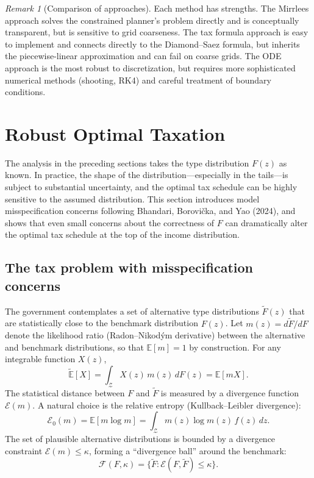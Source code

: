 \documentclass[12pt,a4paper]{article}
\theoremstyle{definition}
\theoremstyle{plain}
\theoremstyle{remark}
\newtheorem{remark}{Remark}[section]
\newcommand{\E}{\mathbb{E}}
\newcommand{\calZ}{\mathcal{Z}}
\begin{document}
\begin{remark}[Comparison of approaches]
Each method has strengths. The Mirrlees approach solves the constrained planner's problem directly and is conceptually transparent, but is sensitive to grid coarseness. The tax formula approach is easy to implement and connects directly to the Diamond--Saez formula, but inherits the piecewise-linear approximation and can fail on coarse grids. The ODE approach is the most robust to discretization, but requires more sophisticated numerical methods (shooting, RK4) and careful treatment of boundary conditions.
\end{remark}



\section{Robust Optimal Taxation}
\label{sec:robust_taxation}

The analysis in the preceding sections takes the type distribution $F(z)$ as known. In practice, the shape of the distribution---especially in the tails---is subject to substantial uncertainty, and the optimal tax schedule can be highly sensitive to the assumed distribution. This section introduces model misspecification concerns following Bhandari, Borovi\v{c}ka, and Yao (2024), and shows that even small concerns about the correctness of $F$ can dramatically alter the optimal tax schedule at the top of the income distribution.

\subsection{The tax problem with misspecification concerns}
\label{sec:robust_problem}

The government contemplates a set of alternative type distributions $\widetilde{F}(z)$ that are statistically close to the benchmark distribution $F(z)$. Let $m(z) = d\widetilde{F}/dF$ denote the likelihood ratio (Radon--Nikod\'{y}m derivative) between the alternative and benchmark distributions, so that $\E[m] = 1$ by construction. For any integrable function $X(z)$,
\[
  \widetilde{\E}[X] = \int_{\calZ} X(z)\, m(z)\, dF(z) = \E[mX].
\]
The statistical distance between $F$ and $\widetilde{F}$ is measured by a divergence function $\mathcal{E}(m)$. A natural choice is the relative entropy (Kullback--Leibler divergence):
\begin{equation}
\label{eq:relative_entropy}
  \mathcal{E}_0(m) = \E[m \log m] = \int_{\calZ} m(z) \log m(z)\, f(z)\, dz.
\end{equation}
The set of plausible alternative distributions is bounded by a divergence constraint $\mathcal{E}(m) \leq \kappa$, forming a ``divergence ball'' around the benchmark:
\[
  \mathcal{F}(F, \kappa) = \bigl\{\widetilde{F} : \mathcal{E}(F, \widetilde{F}) \leq \kappa\bigr\}.
\]
\end{document}
